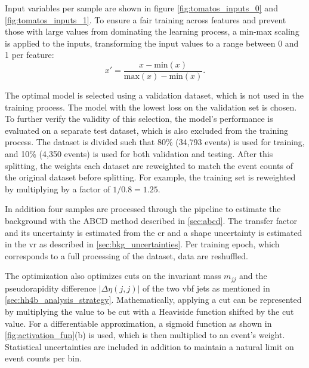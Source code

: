 Input variables per sample are shown in figure \ref{fig:tomatos_inputs_0} and \ref{fig:tomatos_inputs_1}. To ensure a fair training across features and prevent those with large values from dominating the learning process, a min-max scaling is applied to the inputs, transforming the input values to a range between 0 and 1 per feature:
\begin{equation}
    x'=\frac{x - \text{min}(x)}{\text{max}(x)-\text{min}(x)}.
\end{equation}


The optimal model is selected using a validation dataset, which is not used in the training process. The model with the lowest loss on the validation set is chosen. To further verify the validity of this selection, the model's performance is evaluated on a separate test dataset, which is also excluded from the training process. The dataset is divided such that 80\% (34,793 events) is used for training, and 10\% (4,350 events) is used for both validation and testing. After this splitting, the weights each dataset are reweighted to match the event counts of the original dataset before splitting. For example, the training set is reweighted by multiplying by a factor of $1/0.8 = 1.25$.

In addition four samples are processed through the pipeline to estimate the background with the ABCD method described in \ref{sec:abcd}. The transfer factor and its uncertainty is estimated from the \ac{cr} and a shape uncertainty is estimated in the \ac{vr} as described in \ref{sec:bkg_uncertainties}. Per training epoch, which corresponds to a full processing of the dataset, data are reshuffled.

The optimization also optimizes cuts on the invariant mass $m_{jj}$ and the pseudorapidity difference $|\Delta\eta(j,j)|$ of the two \ac{vbf} jets as mentioned in \ref{sec:hh4b_analysis_strategy}. Mathematically, applying a cut can be represented by multiplying the value to be cut with a Heaviside function shifted by the cut value. For a differentiable approximation, a sigmoid function as shown in \ref{fig:activation_fun}(b) is used, which is then multiplied to an event's weight. Statistical uncertainties are included in addition to maintain a natural limit on event counts per bin.

